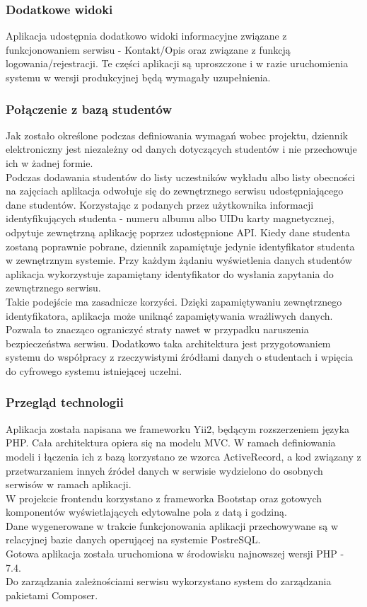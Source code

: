 \documentclass[declaration,shortabstract, mgr]{iithesis}
\begin{document}
\subsubsection{Dodatkowe widoki}
\indent Aplikacja udostępnia dodatkowo widoki informacyjne związane z funkcjonowaniem serwisu - Kontakt/Opis oraz związane z funkcją logowania/rejestracji. Te części aplikacji są uproszczone i w razie uruchomienia systemu w wersji produkcyjnej będą wymagały uzupełnienia.

\subsubsection{Połączenie z bazą studentów}
\indent Jak zostało określone podczas definiowania wymagań wobec projektu, dziennik elektroniczny jest niezależny od danych dotyczących studentów i nie przechowuje ich w żadnej formie.\\
\indent Podczas dodawania studentów do listy uczestników wykładu albo listy obecności na zajęciach aplikacja odwołuje się do zewnętrznego serwisu udostępniającego dane studentów. Korzystając z podanych przez użytkownika informacji identyfikujących studenta - numeru albumu albo UIDu karty magnetycznej, odpytuje zewnętrzną aplikację poprzez udostępnione API. Kiedy dane studenta zostaną poprawnie pobrane, dziennik zapamiętuje jedynie identyfikator studenta w zewnętrznym systemie. Przy każdym żądaniu wyświetlenia danych studentów aplikacja wykorzystuje zapamiętany identyfikator do wysłania zapytania do zewnętrznego serwisu. \\
\indent Takie podejście ma zasadnicze korzyści. Dzięki zapamiętywaniu zewnętrznego identyfikatora, aplikacja może uniknąć zapamiętywania wrażliwych danych. Pozwala to znacząco ograniczyć straty nawet w przypadku naruszenia bezpieczeństwa serwisu. Dodatkowo taka architektura jest przygotowaniem systemu do współpracy z rzeczywistymi źródłami danych o studentach i wpięcia do cyfrowego systemu istniejącej uczelni.\\
\subsubsection{Przegląd technologii}
\indent Aplikacja została napisana we frameworku Yii2\cite{yii}, będącym rozszerzeniem języka PHP. Cała architektura opiera się na modelu MVC. W ramach definiowania modeli i łączenia ich z bazą korzystano ze wzorca ActiveRecord, a kod związany z przetwarzaniem innych źródeł danych w serwisie wydzielono do osobnych serwisów w ramach aplikacji.\\
\indent W projekcie frontendu korzystano z frameworka Bootstap\cite{bootstrap} oraz gotowych komponentów\cite{kartik}\cite{da1}\cite{da2} wyświetlających edytowalne pola z datą i godziną. \\
\indent Dane wygenerowane w trakcie funkcjonowania aplikacji przechowywane są w relacyjnej bazie danych operującej na systemie PostreSQL\cite{psql}.\\
\indent Gotowa aplikacja została uruchomiona w środowisku najnowszej wersji PHP - 7.4.\\
\indent Do zarządzania zależnościami serwisu wykorzystano system do zarządzania pakietami Composer\cite{composer}.
\end{document}
